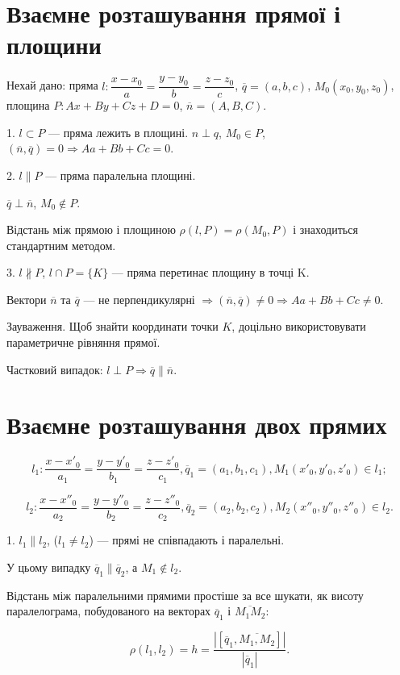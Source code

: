\section{Взаємне розташування прямої і площини}


Нехай дано:
пряма $l: \dfrac{x-x_0}{a} = \dfrac{y-y_0}{b} = \dfrac{z-z_0}{c}$, $\overline{q} = (a,b,c)$,
$M_0(x_0,y_0,z_0)$,
площина $P: Ax + By + Cz + D = 0$, $\overline{n} = (A,B,C)$.

1. $l \subset P$ --- пряма лежить в площині. 
$n \perp q$,
$M_0 \in P$, $(\overline{n},\overline{q}) = 0 \Rightarrow Aa + Bb + Cc = 0$.


2. $l \parallel P$ --- пряма паралельна площині.

$\overline{q} \perp \overline{n}$, $M_0 \notin P$.

Відстань між прямою і площиною
$\rho(l,P) = \rho(M_0,P)$ і
знаходиться стандартним методом.


3. $l \nparallel P$, $l \cap P = \{K\}$ — пряма перетинає площину в точці K.

Вектори $\overline{n}$ та $\overline{q}$ --- не перпендикулярні
$\Rightarrow (\overline{n},\overline{q}) \neq 0 \Rightarrow Aa + Bb + Cc \neq 0$.

Зауваження. Щоб знайти координати точки $K$, доцільно
використовувати параметричне рівняння прямої.

Частковий випадок:
$l \perp P \Rightarrow \overline{q} \parallel \overline{n}$.


\section{Взаємне розташування двох прямих}

$$l_1: \dfrac{x-x'_0}{a_1} = \dfrac{y-y'_0}{b_1} = \dfrac{z-z'_0}{c_1},
\overline{q}_1 = (a_1,b_1,c_1),
M_1(x'_0,y'_0,z'_0) \in l_1;$$

$$l_2: \dfrac{x-x''_0}{a_2} = \dfrac{y-y''_0}{b_2} = \dfrac{z-z''_0}{c_2},
\overline{q}_2 = (a_2,b_2,c_2),
M_2(x''_0,y''_0,z''_0) \in l_2.$$

1. $l_1 \parallel l_2$, ($l_1 \neq l_2$) --- прямі не співпадають і паралельні.


У цьому випадку $\overline{q}_1 \parallel \overline{q}_2$, а $M_1 \notin l_2$.

Відстань між паралельними прямими
простіше за все шукати, як висоту
паралелограма, побудованого на
векторах $\overline{q}_1$ і $\overline{M_1M_2}$:

$$\rho(l_1,l_2) = h = \dfrac{|[\overline{q}_1,\overline{M_1,M_2}]|}{|\overline{q}_1|}.$$



